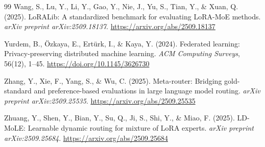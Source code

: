 \documentclass[11pt]{article}
\begin{document}
\begin{thebibliography}{99}
Wang, S., Lu, Y., Li, Y., Gao, Y., Nie, J., Yu, S., Tian, Y., \& Xuan, Q. (2025).
\newblock LoRALib: A standardized benchmark for evaluating LoRA-MoE methods.
\newblock \textit{arXiv preprint arXiv:2509.18137}.
\newblock \url{https://arxiv.org/abs/2509.18137}

Yurdem, B., \"Ozkaya, E., Ert\"urk, I., \& Kaya, Y. (2024).
\newblock Federated learning: Privacy-preserving distributed machine learning.
\newblock \textit{ACM Computing Surveys}, 56(12), 1--45.
\newblock \url{https://doi.org/10.1145/3626730}

Zhang, Y., Xie, F., Yang, S., \& Wu, C. (2025).
\newblock Meta-router: Bridging gold-standard and preference-based evaluations in large language model routing.
\newblock \textit{arXiv preprint arXiv:2509.25535}.
\newblock \url{https://arxiv.org/abs/2509.25535}

Zhuang, Y., Shen, Y., Bian, Y., Su, Q., Ji, S., Shi, Y., \& Miao, F. (2025).
\newblock LD-MoLE: Learnable dynamic routing for mixture of LoRA experts.
\newblock \textit{arXiv preprint arXiv:2509.25684}.
\newblock \url{https://arxiv.org/abs/2509.25684}

\end{thebibliography}
\end{document}

